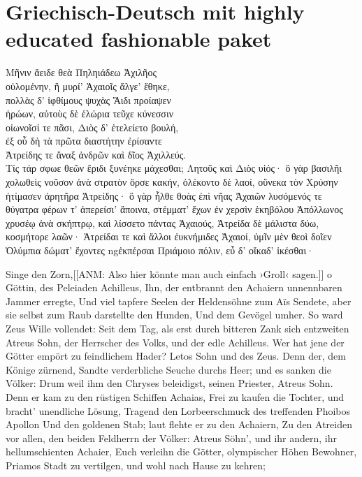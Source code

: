 \section{Griechisch-Deutsch mit highly educated fashionable paket}
\begin{pairs}
\begin{Leftside}
\beginnumbering
\pstart
Μῆνιν ἄειδε θεὰ Πηληιάδεω Ἀχιλῆος\\ 
οὐλομένην, ἣ μυρί' Ἀχαιοῖς ἄλγε' ἔθηκε,\\ 
πολλὰς δ' ἰφθίμους ψυχὰς Ἄιδι προίαψεν\\
ἡρώων, αὐτοὺς δὲ ἑλώρια τεῦχε κύνεσσιν\\
οἰωνοῖσί τε πᾶσι, Διὸς δ' ἐτελείετο βουλή,\\ 
ἐξ οὗ δὴ τὰ πρῶτα διαστήτην ἐρίσαντε\\
Ἀτρείδης τε ἄναξ ἀνδρῶν καὶ δῖος Ἀχιλλεύς.\\
\pend
\pstart
Τίς τάρ σφωε θεῶν ἔριδι ξυνέηκε μάχεσθαι; 
Λητοῦς καὶ Διὸς υἱός· ὃ γὰρ βασιλῆι χολωθεὶς 
νοῦσον ἀνὰ στρατὸν ὄρσε κακήν, ὀλέκοντο δὲ λαοί, 
οὕνεκα τὸν Xρύσην ἠτίμασεν ἀρητῆρα 
Ἀτρείδης·
\pend
\pstart
ὃ γὰρ ἦλθε θοὰς ἐπὶ νῆας Ἀχαιῶν
λυσόμενός τε θύγατρα φέρων τ' ἀπερείσι' ἄποινα, 
στέμματ' ἔχων ἐν χερσὶν ἑκηβόλου Ἀπόλλωνος
χρυσέῳ ἀνὰ σκήπτρῳ, καὶ λίσσετο πάντας Ἀχαιούς, 
Ἀτρείδα δὲ μάλιστα δύω, κοσμήτορε λαῶν· 
Ἀτρείδαι τε καὶ ἄλλοι ἐυκνήμιδες Ἀχαιοί, 
ὑμῖν μὲν θεοὶ δοῖεν Ὀλύμπια δώματ' ἔχοντες 
ngἐκπέρσαι Πριάμοιο πόλιν, εὖ δ' οἴκαδ' ἱκέσθαι·
\pend
\endnumbering
\end{Leftside}
\begin{Rightside}
\beginnumbering
\pstart
Singe den Zorn,[[ANM: Also hier könnte man auch einfach ›Groll‹ sagen.]] o Göttin, des Peleiaden Achilleus, 
Ihn, der entbrannt den Achaiern unnennbaren Jammer erregte,
Und viel tapfere Seelen der Heldensöhne zum Aïs
Sendete, aber sie selbst zum Raub darstellte den Hunden,
Und dem Gevögel umher. So ward Zeus Wille vollendet:
Seit dem Tag, als erst durch bitteren Zank sich entzweiten
Atreus Sohn, der Herrscher des Volks, und der edle Achilleus.
\pend
\pstart
Wer hat jene der Götter empört zu feindlichem Hader?
Letos Sohn und des Zeus. Denn der, dem Könige zürnend,
Sandte verderbliche Seuche durchs Heer; und es sanken die Völker:
Drum weil ihm den Chryses beleidigst, seinen Priester,
Atreus Sohn.
\pend
\pstart
Denn er kam zu den rüstigen Schiffen Achaias,
Frei zu kaufen die Tochter, und bracht' unendliche Lösung,
Tragend den Lorbeerschmuck des treffenden Phoibos Apollon
Und den goldenen Stab; laut flehte er zu den Achaiern,
Zu den Atreiden vor allen, den beiden Feldherrn der Völker: 
Atreus Söhn', und ihr andern, ihr hellumschienten Achaier,
Euch verleihn die Götter, olympischer Höhen Bewohner,
Priamos Stadt zu vertilgen, und wohl nach Hause zu kehren;
\pend

\endnumbering
\end{Rightside}
\end{pairs}

\Pages%



 
